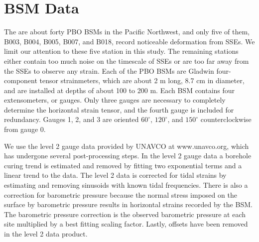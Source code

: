 \section{BSM Data}
The are about forty PBO BSMs in the Pacific Northwest, and only five
of them, B003, B004, B005, B007, and B018, record noticeable
deformation from SSEs. We limit our attention to these five station in
this study.  The remaining stations either contain too much noise on
the timescale of SSEs or are too far away from the SSEs to observe any
strain. Each of the PBO BSMs are Gladwin four-component tensor
strainmeters, which are about 2 m long, 8.7 cm in diameter, and are
installed at depths of about 100 to 200 m. Each BSM contains four
extensometers, or gauges. Only three gauges are necessary to
completely determine the horizontal strain tensor, and the fourth
gauge is included for redundancy. Gauges 1, 2, and 3 are oriented
$60^\circ$, $120^\circ$, and $150^\circ$ counterclockwise from gauge
0.

We use the level 2 gauge data provided by UNAVCO at www.unavco.org,
which has undergone several post-processing steps. In the level 2
gauge data a borehole curing trend is estimated and removed by fitting
two exponential terms and a linear trend to the data. The level 2 data
is corrected for tidal strains by estimating and removing sinusoids
with known tidal frequencies. There is also a correction for
barometric pressure because the normal stress imposed on the surface
by barometric pressure results in horizontal strains recorded by the
BSM. The barometric pressure correction is the observed barometric
pressure at each site multiplied by a best fitting scaling factor.
Lastly, offsets have been removed in the level 2 data product.


